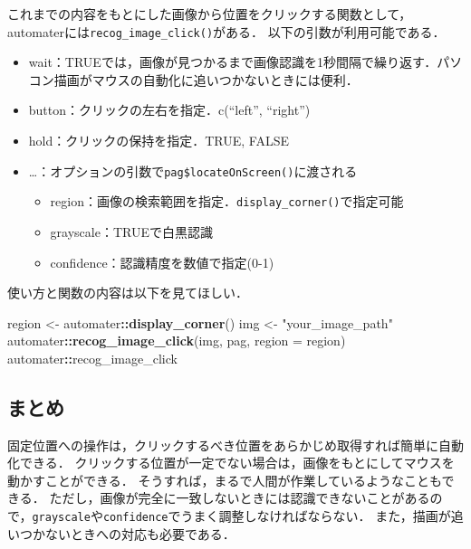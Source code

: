 \documentclass[
]{article}
\newenvironment{Shaded}{\begin{snugshade}}{\end{snugshade}}
\newcommand{\AttributeTok}[1]{\textcolor[rgb]{0.13,0.29,0.53}{#1}}
\newcommand{\FunctionTok}[1]{\textcolor[rgb]{0.13,0.29,0.53}{\textbf{#1}}}
\newcommand{\NormalTok}[1]{#1}
\newcommand{\OtherTok}[1]{\textcolor[rgb]{0.56,0.35,0.01}{#1}}
\newcommand{\SpecialCharTok}[1]{\textcolor[rgb]{0.81,0.36,0.00}{\textbf{#1}}}
\newcommand{\StringTok}[1]{\textcolor[rgb]{0.31,0.60,0.02}{#1}}
\providecommand{\tightlist}{%
  \setlength{\itemsep}{0pt}\setlength{\parskip}{0pt}}
\begin{document}
これまでの内容をもとにした画像から位置をクリックする関数として，automaterには\texttt{recog\_image\_click()}がある．
以下の引数が利用可能である．

\begin{itemize}
\tightlist
\item
  wait：TRUEでは，画像が見つかるまで画像認識を1秒間隔で繰り返す．パソコン描画がマウスの自動化に追いつかないときには便利．
\item
  button：クリックの左右を指定．c(``left'', ``right'')
\item
  hold：クリックの保持を指定．TRUE, FALSE\\
\item
  \ldots：オプションの引数で\texttt{pag\$locateOnScreen()}に渡される

  \begin{itemize}
  \tightlist
  \item
    region：画像の検索範囲を指定．\texttt{display\_corner()}で指定可能\\
  \item
    grayscale：TRUEで白黒認識\\
  \item
    confidence：認識精度を数値で指定(0-1)
  \end{itemize}
\end{itemize}

使い方と関数の内容は以下を見てほしい．

\begin{Shaded}
\begin{Highlighting}[]
\NormalTok{region }\OtherTok{\textless{}{-}}\NormalTok{ automater}\SpecialCharTok{::}\FunctionTok{display\_corner}\NormalTok{()}
\NormalTok{img }\OtherTok{\textless{}{-}} \StringTok{"your\_image\_path"}
\NormalTok{automater}\SpecialCharTok{::}\FunctionTok{recog\_image\_click}\NormalTok{(img, pag, }\AttributeTok{region =}\NormalTok{ region)}
\NormalTok{automater}\SpecialCharTok{::}\NormalTok{recog\_image\_click}
\end{Highlighting}
\end{Shaded}

\hypertarget{ux307eux3068ux3081}{%
\subsection{まとめ}\label{ux307eux3068ux3081}}

固定位置への操作は，クリックするべき位置をあらかじめ取得すれば簡単に自動化できる．
クリックする位置が一定でない場合は，画像をもとにしてマウスを動かすことができる．
そうすれば，まるで人間が作業しているようなこともできる．
ただし，画像が完全に一致しないときには認識できないことがあるので，\texttt{grayscale}や\texttt{confidence}でうまく調整しなければならない．
また，描画が追いつかないときへの対応も必要である．
\end{document}
